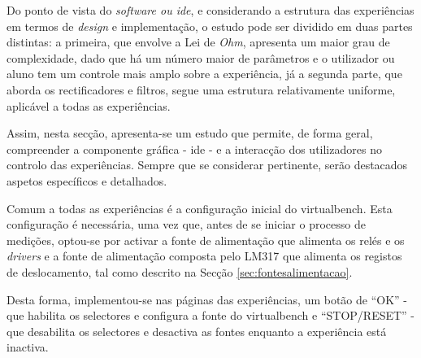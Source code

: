 



Do ponto de vista do \textit{software ou \acrshort{ide}}, e considerando a estrutura das experiências em termos de \textit{design} e implementação, o estudo pode ser dividido em duas partes distintas: a primeira, que envolve a Lei de \textit{Ohm}, apresenta um maior grau de complexidade, dado que há um número maior de parâmetros e o utilizador ou aluno tem um controle mais amplo sobre a experiência, já a segunda parte, que aborda os rectificadores e filtros, segue uma estrutura relativamente uniforme, aplicável a todas as experiências.

Assim, nesta secção, apresenta-se um estudo que permite, de forma geral, compreender a componente gráfica - \acrshort{ide} - e a interacção dos utilizadores no controlo das experiências. Sempre que se considerar pertinente, serão destacados aspetos específicos e detalhados.


Comum a todas as experiências é a configuração inicial do \acrshort{virtualbench}. Esta configuração é necessária, uma vez que, antes de se iniciar o processo de medições, optou-se por activar a fonte de alimentação que alimenta os relés e os \textit{drivers} e a fonte de alimentação composta pelo LM317 que alimenta os registos de deslocamento, tal como descrito na Secção \ref{sec:fontesalimentacao}. 

Desta forma, implementou-se nas páginas das experiências, um botão de ``OK'' - que habilita os selectores e configura a fonte do \acrshort{virtualbench} e ``STOP/RESET'' - que desabilita os selectores e desactiva as fontes enquanto a experiência está inactiva. 

